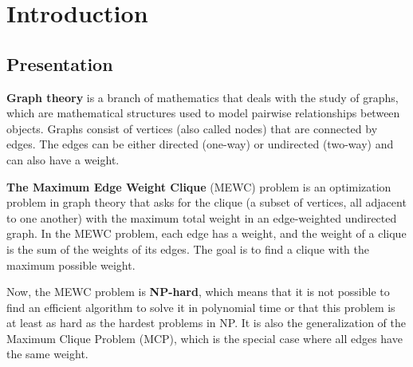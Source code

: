 
\section{Introduction}

\subsection{Presentation}

\textbf{Graph theory} is a branch of mathematics that deals with the study of graphs,
which are mathematical structures used to model pairwise relationships between
objects. Graphs consist of vertices (also called nodes) that are connected by
edges. The edges can be either directed (one-way) or undirected (two-way) and can
also have a weight. \newline

\textbf{The Maximum Edge Weight Clique} (MEWC) problem is an optimization problem
in graph theory that asks for the clique (a subset of vertices, all adjacent to
one another) with the maximum total weight in an edge-weighted undirected graph.
In the MEWC problem, each edge has a weight, and the weight of a clique is the
sum of the weights of its edges. The goal is to find a clique with the maximum
possible weight. \newline

Now, the MEWC problem is \textbf{NP-hard}, which means that it is not possible
to find an efficient algorithm to solve it in polynomial time or that this problem
is at least as hard as the hardest problems in NP. It is also the generalization
of the Maximum Clique Problem (MCP), which is the special case where all edges
have the same weight. \newline


